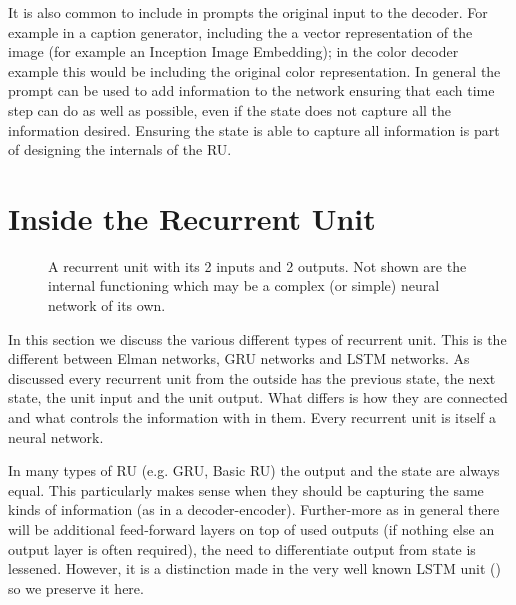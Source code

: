 \documentclass[12pt,parskip]{komatufte}
\begin{document}
It is also common to include in prompts the original input to the decoder.
For example in a caption generator, including the a vector representation of the image (for example an Inception Image Embedding); in the color decoder example this would be including the original color representation.
In general the prompt can be used to add information to the network ensuring that each time step can do as well as possible, even if the state does not capture all the information desired.
Ensuring the state is able to capture all information is part of designing the internals of the RU.


\section{Inside the Recurrent Unit}
\begin{figure}
	\caption{A recurrent unit with its 2 inputs and 2 outputs. Not shown are the internal functioning which may be a complex (or simple) neural network of its own.}	
	
	\label{fig-ru}
	
	
\end{figure}


In this section we discuss the various different types of recurrent unit.
This is the different between Elman networks, GRU networks and LSTM networks.
As discussed every recurrent unit from the outside has the previous state, the next state, the unit input and the unit output.
What differs is how they are connected and what controls the information with in them.
Every recurrent unit is itself a neural network.

In many types of RU (e.g. GRU, Basic RU) the output and the state are always equal.
This particularly makes sense when they should be capturing the same kinds of information (as in a decoder-encoder).
Further-more as in general there will be additional feed-forward layers on top of used outputs (if nothing else an output layer is often required), the need to differentiate output from state is lessened.
However, it is a distinction made in the very well known LSTM unit () so we preserve it here.
\end{document}
